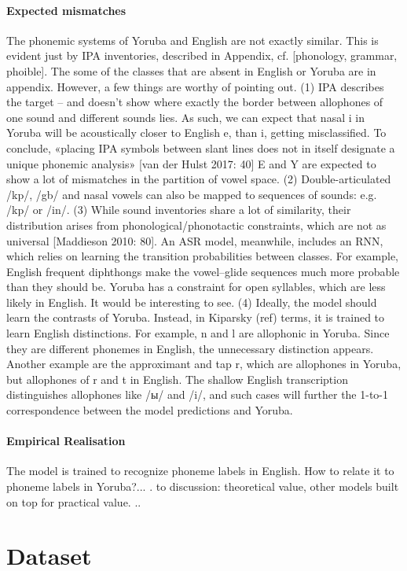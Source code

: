 \documentclass[11pt]{article}
\begin{document}
\paragraph{Expected mismatches} The phonemic systems of Yoruba and English are not exactly similar. This is evident just by IPA inventories, described in Appendix, cf. [phonology, grammar, phoible]. The some of the classes that are absent in English or Yoruba are in appendix. However, a few things are worthy of pointing out. (1) IPA describes the target -- and doesn't show where exactly the border between allophones of one sound and different sounds lies. As such, we can expect that nasal i in Yoruba will be acoustically closer to English e, than i, getting misclassified. To conclude, «placing IPA symbols between slant lines does not in itself designate a unique phonemic analysis» [van der Hulst 2017: 40] E and Y are expected to show a lot of mismatches in the partition of vowel space. (2) Double-articulated /kp/, /gb/ and nasal vowels can also be mapped to sequences of sounds: e.g. /kp/ or /in/. (3) While sound inventories share a lot of similarity, their distribution arises from phonological/phonotactic constraints, which are not as universal [Maddieson 2010: 80]. An ASR model, meanwhile, includes an RNN, which relies on learning the transition probabilities between classes. For example, English frequent diphthongs make the vowel--glide sequences much more probable than they should be. Yoruba has a constraint for open syllables, which are less likely in English. It would be interesting to see. (4) Ideally, the model should learn the contrasts of Yoruba. Instead, in Kiparsky (ref) terms, it is trained to learn English distinctions. For example, n and l are allophonic in Yoruba. Since they are different phonemes in English, the unnecessary distinction appears. Another example are the approximant and tap r, which are allophones in Yoruba, but allophones of r and t in English. The shallow English transcription distinguishes allophones like /ы/ and /i/, and such cases will further the 1-to-1 correspondence between the model predictions and Yoruba.
\paragraph{Empirical Realisation} The model is trained to recognize phoneme labels in English. How to relate it to phoneme labels in Yoruba?... . to discussion: theoretical value, other models built on top for practical value.   ..

\section{Dataset}
\end{document}
